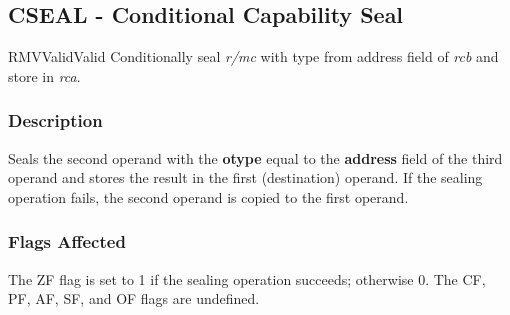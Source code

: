 \clearpage
{}
{}
\subsection*{CSEAL - Conditional Capability Seal}

\begin{x86opcodetable}
  {RMV}{Valid}{Valid}
  {Conditionally seal \emph{r/mc} with type from address field of
    \emph{rcb} and store in \emph{rca}.}
\end{x86opcodetable}

\begin{x86opentable}
\end{x86opentable}

\subsubsection*{Description}

Seals the second operand with the \textbf{otype} equal to the
\textbf{address} field of the third operand and stores the result in
the first (destination) operand.  If the sealing operation fails, the
second operand is copied to the first operand.

\subsubsection*{Flags Affected}

The ZF flag is set to 1 if the sealing operation succeeds; otherwise
0.  The CF, PF, AF, SF, and OF flags are undefined.
